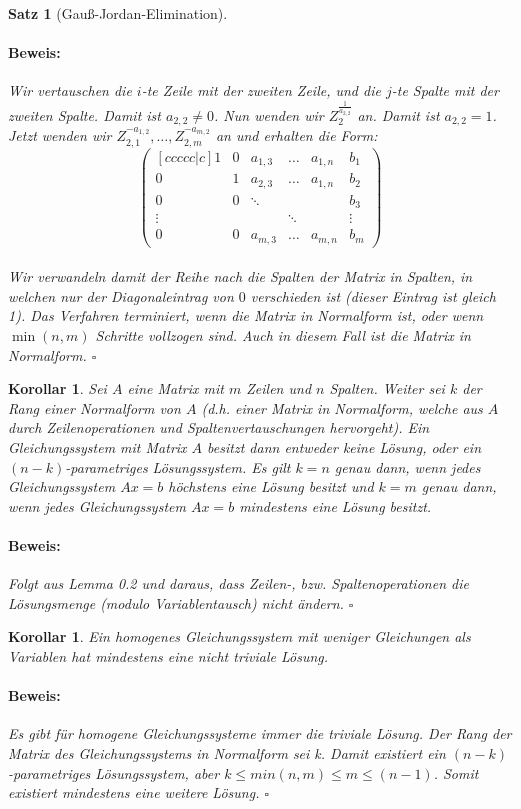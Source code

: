 \documentclass{report}
\theoremstyle{customrem}
\theoremstyle{customdef}
\newtheorem{kor}[definition]{Korollar}
\newtheorem{satz}[definition]{Satz}
\renewenvironment{proof}{\vspace{-.75cm}\paragraph{Beweis: }}{\vspace{-.5cm}\hfill$\square$}
\begin{document}
\begin{satz}[Gauß-Jordan-Elimination]
\begin{proof}
			Wir vertauschen die $i$-te Zeile mit der zweiten Zeile, und die $j$-te Spalte mit der zweiten Spalte. Damit ist $a_{2,2} \neq 0$. Nun wenden wir $Z_{2}^{\frac{1}{a_{2,2}}}$ an. Damit ist $a_{2,2} = 1$. Jetzt wenden wir $Z_{2,1}^{-a_{1,2}}, \dots, Z_{2,m}^{-a_{m,2}}$ an und erhalten die Form:
			$$
			\begin{pmatrix}[ccccc|c]
			1 & 0 & a_{1, 3} & \dots & a_{1, n} & b_1\\
			0 & 1 & a_{2, 3} & \dots & a_{1, n} & b_2\\
			0 & 0 & \ddots	 &		 & 			& b_3\\
			\vdots&&		 & \ddots&			& \vdots\\
			0 & 0 & a_{m, 3} & \dots & a_{m, n} & b_m
			\end{pmatrix}
			$$\\
			Wir verwandeln damit der Reihe nach die Spalten der Matrix in Spalten, in welchen nur der Diagonaleintrag von $0$ verschieden ist (dieser Eintrag ist gleich 1).
			Das Verfahren terminiert, wenn die Matrix in Normalform ist, oder wenn $\min(n, m)$ Schritte vollzogen sind. Auch in diesem Fall ist die Matrix in Normalform.
		\end{proof}
	\end{satz}
	
	\begin{kor}
		Sei $A$ eine Matrix mit $m$ Zeilen und $n$ Spalten. Weiter sei $k$ der Rang einer Normalform von $A$ (d.h. einer Matrix in Normalform, welche aus $A$ durch Zeilenoperationen und Spaltenvertauschungen hervorgeht). Ein Gleichungssystem  mit Matrix $A$ besitzt dann entweder keine Lösung, oder ein $(n-k)$-parametriges Lösungssystem. Es gilt $k=n$ genau dann, wenn jedes Gleichungssystem $Ax=b$ höchstens eine Lösung besitzt und $k=m$ genau dann, wenn jedes Gleichungssystem $Ax=b$ mindestens eine Lösung besitzt.\\
		\begin{proof}
			Folgt aus Lemma 0.2 und daraus, dass Zeilen-, bzw. Spaltenoperationen die Lösungsmenge (modulo Variablentausch) nicht ändern.
		\end{proof}
	\end{kor}
	
	\begin{kor}
		\label{kor5}
		Ein homogenes Gleichungssystem mit weniger Gleichungen als Variablen hat mindestens eine nicht triviale Lösung.\\
		\begin{proof}
			Es gibt für homogene Gleichungssysteme immer die triviale Lösung. Der Rang der Matrix des Gleichungssystems in Normalform sei k. Damit existiert ein $(n-k)$-parametriges Lösungssystem, aber $k \le min(n, m) \le m \le (n-1)$. Somit existiert mindestens eine weitere Lösung.
		\end{proof}
	\end{kor}
\end{document}
